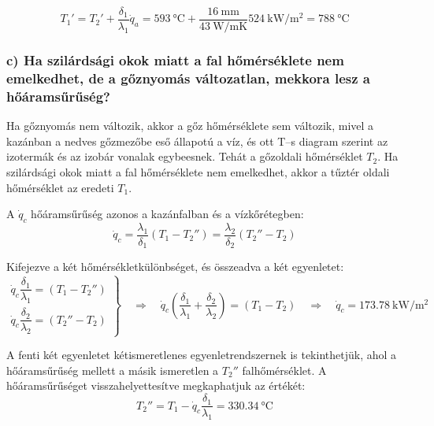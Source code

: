 \begin{equation}
	T_1' = T_2' + \frac{\delta_1}{\lambda_1}\dot{q}_a = \SI{593}{\celsius} + \frac{\SI{16}{\milli\meter}}{\SI{43}{\watt\per\meter\kelvin}} \SI{524}{\kilo\watt\per\meter\squared} = \SI{788}{\celsius}
\end{equation}

\subsubsection*{c) Ha szilárdsági okok miatt a fal hőmérséklete nem emelkedhet, de a gőznyomás változatlan, mekkora lesz a hőáramsűrűség?}

Ha gőznyomás nem változik, akkor a gőz hőmérséklete sem változik, mivel a kazánban a nedves gőzmezőbe eső állapotú a víz, és ott T--s diagram szerint az izotermák és az izobár vonalak egybeesnek. Tehát a gőzoldali hőmérséklet $T_2$. Ha szilárdsági okok miatt a fal hőmérséklete nem emelkedhet, akkor a tűztér oldali hőmérséklet az eredeti $T_1$.

A $\dot{q}_c$ hőáramsűrűség azonos a kazánfalban és a vízkőrétegben:
\begin{equation}
	\dot{q}_c = \frac{\lambda_1}{\delta_1} (T_1 - T_2'') = \frac{\lambda_2}{\delta_2} (T_2'' - T_2)
\end{equation}

Kifejezve a két hőmérsékletkülönbséget, és összeadva a két egyenletet:
\begin{equation}
	\left.
	\begin{array}{lcl}
		\dot{q}_c \dfrac{\delta_1}{\lambda_1} = (T_1 - T_2'') \\
		\dot{q}_c \dfrac{\delta_2}{\lambda_2} = (T_2'' - T_2)
	\end{array}
	\right\rbrace
	\quad \Rightarrow \quad 
	\dot{q}_c \left(\dfrac{\delta_1}{\lambda_1} + \dfrac{\delta_2}{\lambda_2} \right) = (T_1 - T_2) 
	\quad \Rightarrow \quad 
	\dot{q}_c = 
	\SI{173.78}{\kilo\watt\per\meter\squared}
\end{equation}

A fenti két egyenletet kétismeretlenes egyenletrendszernek is tekinthetjük, ahol a hőáramsűrűség mellett a másik ismeretlen a $T_2''$ falhőmérséklet. A hőáramsűrűséget visszahelyettesítve megkaphatjuk az értékét:
\begin{equation}
	T_2'' = T_1 - \dot{q}_c \dfrac{\delta_1}{\lambda_1} = \SI{330.34}{\celsius}
\end{equation}

\pagebreak
